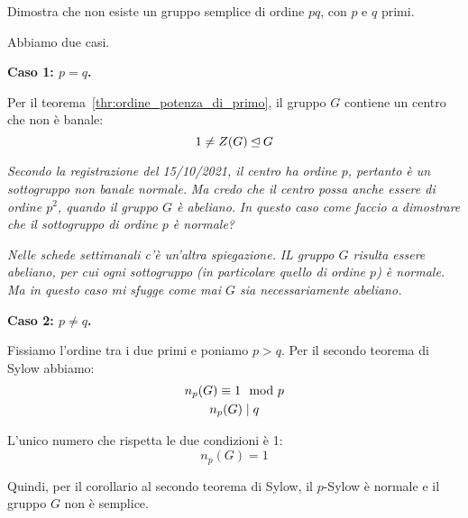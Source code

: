 \begin{esercizio}
    Dimostra che non esiste un gruppo semplice di ordine $pq$, con $p$ e $q$ primi.
\end{esercizio}
\begin{soluzione}
    Abbiamo due casi.

    \bigskip
    \textbf{Caso 1: $p = q$.}

    Per il teorema~\ref{thr:ordine_potenza_di_primo}, il gruppo $G$ contiene un centro che non è banale:
    \begin{equation*}
        1 \ne Z(G) \unlhd G
    \end{equation*}

    \emph{Secondo la registrazione del 15/10/2021, il centro ha ordine $p$, pertanto è un sottogruppo non banale normale.}
    \emph{Ma credo che il centro possa anche essere di ordine $p^2$, quando il gruppo $G$ è abeliano.}
    \emph{In questo caso come faccio a dimostrare che il sottogruppo di ordine $p$ è normale?}

    \emph{Nelle schede settimanali c'è un'altra spiegazione.}
    \emph{IL gruppo $G$ risulta essere abeliano, per cui ogni sottogruppo (in particolare quello di ordine $p$) è normale.}
    \emph{Ma in questo caso mi sfugge come mai $G$ sia necessariamente abeliano.}

    \bigskip
    \textbf{Caso 2: $p \ne q$.}

    Fissiamo l'ordine tra i due primi e poniamo $p > q$.
    Per il secondo teorema di Sylow abbiamo:
    \begin{gather*}
        n_p(G) \equiv 1 \mod p \\
        n_p(G) \mid q
    \end{gather*}

    L'unico numero che rispetta le due condizioni è 1:
    \begin{equation*}
        n_p(G) = 1
    \end{equation*}

    Quindi, per il corollario al secondo teorema di Sylow, il $p$-Sylow è normale e il gruppo $G$ non è semplice.
\end{soluzione}

